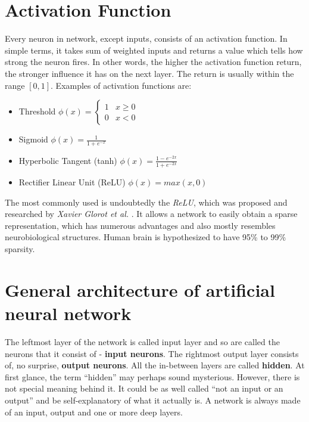 \section{Activation Function}
\label{sec:activation-function}

Every neuron in network, except inputs, consists of an activation function. In simple terms, it takes sum of weighted inputs and returns a value which tells how strong the neuron fires. In other words, the higher the activation function return, the stronger influence it has on the next layer. The return is usually within the range $[0, 1]$. Examples of activation functions are: 
\begin{itemize}
    \item Threshold \hspace{5pt}
        $\phi(x) = 
        \begin{cases}
            1 & x \ge 0 \\
            0 & x<0
        \end{cases}$
    \item Sigmoid \hspace{5pt}
        $\phi(x) = \frac{1}{1+e^{-x}}$
    \item Hyperbolic Tangent (tanh) \hspace{5pt}
        $\phi(x) = \frac{1-e^{-2x}}{1+e^{-2x}}$
    \item Rectifier Linear Unit (ReLU) \hspace{5pt}
        $\phi(x) = max(x, 0)$
\end{itemize}

The most commonly used is undoubtedly the \emph{ReLU}, which was proposed and researched by \emph{Xavier Glorot et al.} \cite{DeepSparseReNN}. It allows a network to easily obtain a sparse representation, which has numerous advantages and also mostly resembles neurobiological structures. Human brain is hypothesized to have 95\% to 99\% sparsity.

\section{General architecture of artificial neural network}
\label{sec:general-architecture-ann}

The leftmost layer of the network is called input layer and so are called the neurons that it consist of - \textbf{input neurons}. The rightmost output layer consists of, no surprise, \textbf{output neurons}. All the in-between layers are called \textbf{hidden}. At first glance, the term ``hidden'' may perhaps sound mysterious. However, there is not special meaning behind it. It could be as well called ``not an input or an output'' and be self-explanatory of what it actually is. A network is always made of an input, output and one or more deep layers.

